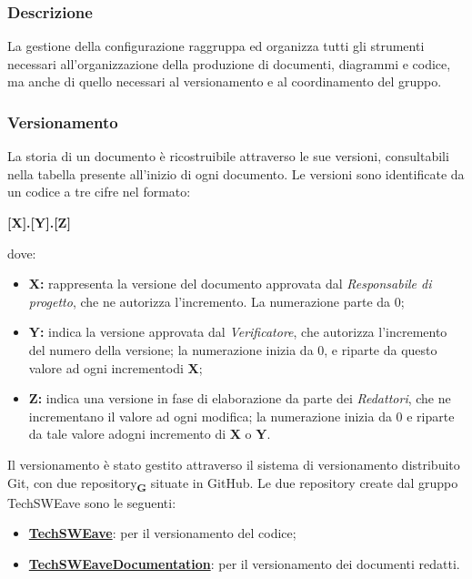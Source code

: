         \subsubsection{Descrizione}
        La gestione della configurazione raggruppa ed organizza tutti gli strumenti necessari all'organizzazione della produzione di documenti, diagrammi e codice, ma anche di quello necessari al versionamento e al coordinamento del gruppo.
        \subsubsection{Versionamento}
        La storia di un documento è ricostruibile attraverso le sue versioni, consultabili nella tabella presente all'inizio di ogni documento. Le versioni sono identificate da un codice a tre cifre nel formato: 
        \begin{center}
            \textbf{\large [X].[Y].[Z]}\\             
        \end{center}
        dove: 
        \begin{itemize}
            \item \textbf{\large X:} rappresenta la versione del documento approvata dal \textit{Responsabile di progetto}, che ne autorizza l'incremento. La numerazione parte da 0;
            \item \textbf{\large Y:} indica la versione approvata dal \textit{Verificatore}, che autorizza l’incremento del numero della versione; la numerazione inizia da 0, e riparte da questo valore ad ogni incrementodi \textbf{X};
            \item \textbf{\large Z:} indica una versione in fase di elaborazione da parte dei \textit{Redattori}, che ne incrementano il valore ad ogni modifica; la numerazione inizia da 0 e riparte da tale valore adogni incremento di \textbf{X} o \textbf{Y}.
        \end{itemize}
        Il versionamento è stato gestito attraverso il sistema di versionamento distribuito Git, con due repository\textsubscript{\textbf{G}} situate in GitHub.
        Le due repository create dal gruppo TechSWEave sono le seguenti:
        \begin{itemize}
            \item \textbf{\href{https://github.com/techsweave/TechSWEave.git}{TechSWEave}}: per il versionamento del codice;
            \item \textbf{\href{https://github.com/techsweave/TechSWEaveDocumentation.git}{TechSWEaveDocumentation}}: per il versionamento dei documenti redatti.
        \end{itemize}
